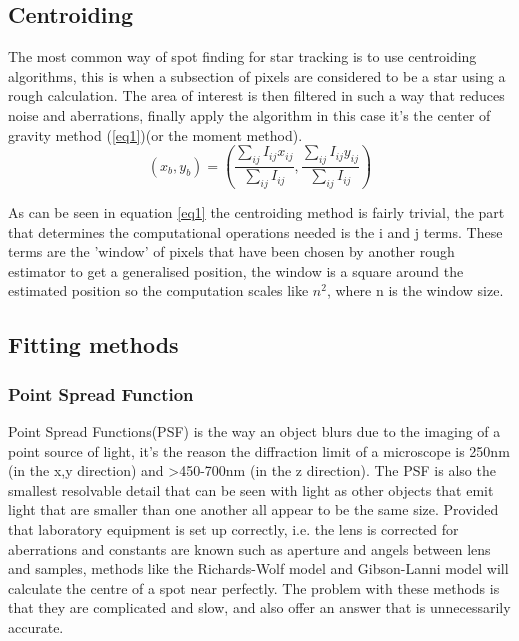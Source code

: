 \documentclass[aps,pra,a4paper,nofootinbib,onecolumn,tightenlines,longbibliography,12pt,amsfonts,amssymb,amsmath,floatfix]{revtex4-2} %
\begin{document}
  \subsection{Centroiding} %
  \label{sub:Centroiding_meth}
  
  
  
  The most common way of spot finding for star tracking is to use centroiding
  algorithms, this is when a subsection of pixels are considered to be a star
  using a rough calculation. The area of interest is then filtered in such a way
  that reduces noise and aberrations, finally apply the algorithm in this case
  it's the center of gravity method (\ref{eq1})(or the moment
  method)\cite{delabie2014accurate}\cite{stone1989comparison}.
  \begin{equation}\label{eq1}
      (x_b,y_b) = \left( {\frac{\sum_{ij} I_{ij}x_{ij}}{\sum_{ij} I_{ij}},\frac{\sum_{ij} I_{ij}y_{ij}}{\sum_{ij} I_{ij}}}\right)
  \end{equation}
  
  As can be seen in equation \ref{eq1} the centroiding method is fairly trivial, 
  the part that determines the computational operations needed is the i and j terms. 
  These terms are the 'window' of pixels that have been chosen by another rough estimator 
  to get a generalised position, the window is a square around the estimated position so 
  the computation scales like $n^2$, where n is the window size.\cite{stone1989comparison}
  
  \subsection{Fitting methods} %
  \label{sub:Various fitting methods}

  \subsubsection{Point Spread Function} %
    \label{ssub:Point Spread Function}
    
    Point Spread Functions(PSF) is the way an object blurs due to the imaging of a point 
    source of light, it's the reason the diffraction limit of a microscope is 250nm (in the
    x,y direction) and >450-700nm (in the z direction).\cite{galbraith2011super} The PSF is also the smallest resolvable
    detail that can be seen with light as other objects that emit light that are smaller than 
    one another all appear to be the same size. Provided that laboratory equipment is set up correctly, 
    i.e. the lens is corrected for aberrations and constants are known such as aperture and angels 
    between lens and samples, methods like the Richards-Wolf model and Gibson-Lanni model will calculate
    the centre of a spot near perfectly. The problem with these methods is that they are complicated and 
    slow, and also offer an answer that is unnecessarily accurate. \cite{richards1959electromagnetic}\cite{small2014fluorophore}
\end{document}
